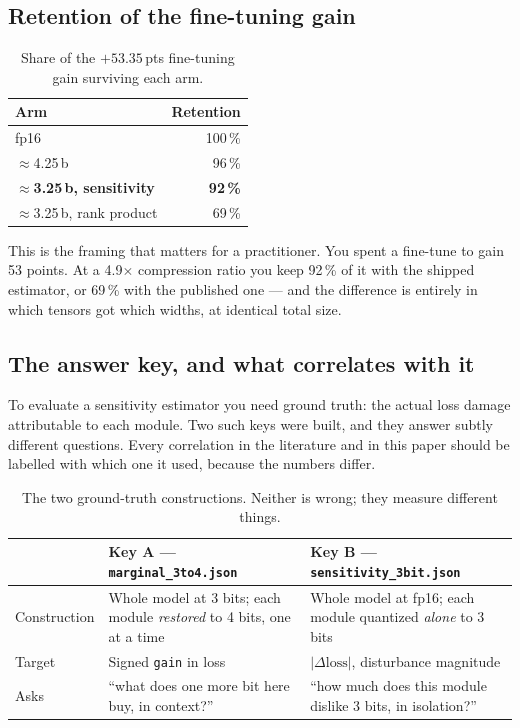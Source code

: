 \documentclass[11pt]{article}
\newcommand{\x}{$\times$}
\newcommand{\pt}{\,pts}
\newcommand{\pct}{\,\%}
\newcommand{\code}[1]{\texttt{#1}}
\begin{document}
\subsection{Retention of the fine-tuning gain}

\begin{table}[H]
\centering\small
\caption{Share of the $+53.35$\pt{} fine-tuning gain surviving each arm.}
\begin{tabular}{lr}
\toprule
Arm & Retention \\
\midrule
fp16 & 100\pct \\
\rowcolor{rowtint}
$\approx$4.25\,b & 96\pct \\
\textbf{$\approx$3.25\,b, sensitivity} & \textbf{92\pct} \\
$\approx$3.25\,b, rank product & 69\pct \\
\bottomrule
\end{tabular}
\end{table}

This is the framing that matters for a practitioner. You spent a fine-tune to gain 53 points. At
a 4.9\x{} compression ratio you keep 92\pct{} of it with the shipped estimator, or 69\pct{} with
the published one --- and the difference is entirely in which tensors got which widths, at
identical total size.

\subsection{The answer key, and what correlates with it}
\label{sec:answerkey}

To evaluate a sensitivity estimator you need ground truth: the actual loss damage attributable to
each module. Two such keys were built, and they answer subtly different questions. Every
correlation in the literature and in this paper should be labelled with which one it used,
because the numbers differ.

\begin{table}[H]
\centering\small
\caption{The two ground-truth constructions. Neither is wrong; they measure different things.}
\begin{tabular}{p{}p{}p{}}
\toprule
& \textbf{Key A} --- \code{marginal\_3to4.json} & \textbf{Key B} --- \code{sensitivity\_3bit.json} \\
\midrule
Construction & Whole model at 3 bits; each module \emph{restored} to 4 bits, one at a time &
Whole model at fp16; each module quantized \emph{alone} to 3 bits \\
\rowcolor{rowtint}
Target & Signed \code{gain} in loss & $|\Delta\text{loss}|$, disturbance magnitude \\
Asks & ``what does one more bit here buy, in context?'' & ``how much does this module dislike
3 bits, in isolation?'' \\
\bottomrule
\end{tabular}
\end{table}
\end{document}
